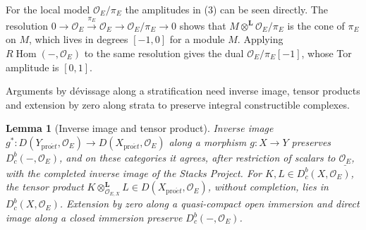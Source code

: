 \documentclass[11pt,a4paper]{article}
\numberwithin{equation}{section}
\newtheorem{lemma}[theorem]{Lemma}
\theoremstyle{definition}
\theoremstyle{remark}
\newcommand{\Dbc}{D^b_c}
\newcommand{\RHom}{R\!\operatorname{Hom}}
\newcommand{\proet}{\mathrm{pro}\acute{e}t}
\begin{document}
For the local model $\mathcal O_E/\pi_E$ the amplitudes in (3) can be seen
directly. The resolution
$0\to\mathcal O_E\xrightarrow{\pi_E}\mathcal O_E\to\mathcal O_E/\pi_E\to0$
shows that $M\otimes^{\mathbf L}\mathcal O_E/\pi_E$ is the cone of $\pi_E$
on $M$, which lives in degrees $[-1,0]$ for a module $M$. Applying
$\RHom(-,\mathcal O_E)$ to the same resolution gives the dual
$\mathcal O_E/\pi_E[-1]$, whose Tor amplitude is $[0,1]$.

Arguments by d\'evissage along a stratification need inverse image,
tensor products and extension by zero along strata to preserve integral
constructible complexes.

\begin{lemma}[Inverse image and tensor product]
\label{i:tensor}
Inverse image $g^*\colon D(Y_{\proet},\mathcal O_E)\to D(X_{\proet},\mathcal O_E)$
along a morphism $g:X\to Y$ preserves $\Dbc(-,\mathcal O_E)$, and on these
categories it agrees, after restriction of scalars to $\underline{\mathcal O_E}$, with
the completed inverse image of the Stacks Project. For
$K,L\in \Dbc(X,\mathcal O_E)$, the tensor product
$K\otimes_{\mathcal O_{E,X}}^{\mathbf L}L\in D(X_{\proet},\mathcal O_E)$, without completion, lies in
$\Dbc(X,\mathcal O_E)$. Extension by zero along a quasi-compact open
immersion and direct image along a closed immersion preserve
$\Dbc(-,\mathcal O_E)$.
\end{lemma}
\end{document}
